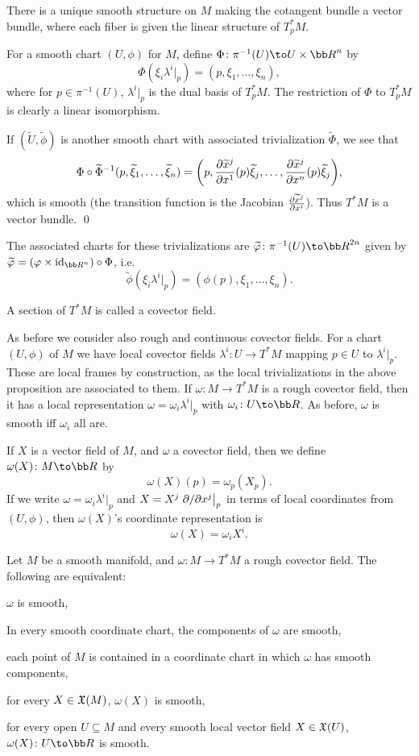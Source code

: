     There is a unique smooth structure on $M$ making the cotangent bundle a vector bundle, where each fiber is given the linear structure of $T_p^*M$.

\eprop

\bproof

    For a smooth chart $(U,\phi)$ for $M$, define $\Phi\colon\pi^{-1}(U)\to U\times\bR^n$ by
    $$ \Phi(\xi_i\lambda^i|_p) = (p,\xi_1,\dots,\xi_n) , $$
    where for $p\in\pi^{-1}(U)$, $\lambda^i|_p$ is the dual basis of $T_p^*M$.
    The restriction of $\Phi$ to $T_p^*M$ is clearly a linear isomorphism.

    If $(\tilde U,\tilde\phi)$ is another smooth chart with associated trivialization $\tilde\Phi$, we see that
    $$ \Phi\circ\widetilde\Phi^{-1}(p,\widetilde\xi_1,\dots,\widetilde\xi_n) = \mathopen{}\mathclose{\left(p,{{\partial \widetilde x^j}\over{\partial x^1}}(p)\widetilde\xi_j,\dots,{{\partial \widetilde x^j}\over{\partial x^n}}(p)\widetilde\xi_j\right)} , $$
    which is smooth (the transition function is the Jacobian ${{\partial \widetilde x^j}\over{\partial x^i}}$).
    Thus $T^*M$ is a vector bundle.
    \qed

\eproof

The associated charts for these trivializations are $\tilde\phi\colon\pi^{-1}(U)\to\bR^{2n}$ given by $\tilde\phi=(\phi\times\id_{\bR^n})\circ\Phi$, i.e.
$$ \tilde\phi(\xi_i\lambda^i|_p) = (\phi(p),\xi_1,\dots,\xi_n) . $$

\bdefn

    A section of $T^*M$ is called a {\emphcolor covector field}.

\edefn

As before we consider also rough and continuous covector fields.
For a chart $(U,\phi)$ of $M$ we have local covector fields $\lambda^i\colon U\to T^*M$ mapping $p\in U$ to $\lambda^i|_p$.
These are local frames by construction, as the local trivializations in the above proposition are associated to them.
If $\omega\colon M\to T^*M$ is a rough covector field, then it has a local representation $\omega=\omega_i\lambda^i|_p$ with $\omega_i\colon U\to\bR$.
As before, $\omega$ is smooth iff $\omega_i$ all are.

If $X$ is a vector field of $M$, and $\omega$ a covector field, then we define $\omega(X)\colon M\to\bR$ by
$$ \omega(X)(p) = \omega_p(X_p) . $$
If we write $\omega=\omega_i\lambda^i|_p$ and $X=X^j\left.\partial /\partial x^j\right|_p$ in terms of local coordinates from $(U,\phi)$, then $\omega(X)$'s coordinate representation is
$$ \omega(X) = \omega_iX^i . $$

\bprop

    Let $M$ be a smooth manifold, and $\omega\colon M\to T^*M$ a rough covector field.
    The following are equivalent:
    \benum
        \item $\omega$ is smooth,
        \item In every smooth coordinate chart, the components of $\omega$ are smooth,
        \item each point of $M$ is contained in a coordinate chart in which $\omega$ has smooth components,
        \item for every $X\in{\frak X}(M)$, $\omega(X)$ is smooth,
        \item for every open $U\subseteq M$ and every smooth local vector field $X\in{\frak X}(U)$, $\omega(X)\colon U\to\bR$ is smooth.
    \eenum

